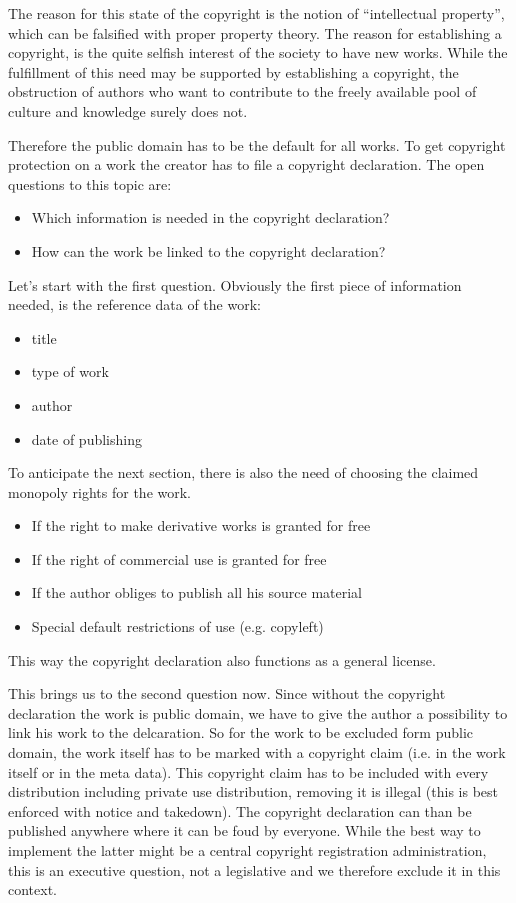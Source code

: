 The reason for this state of the copyright is the notion of ``intellectual property'', which can be falsified with proper property theory. The reason for establishing a copyright, is the quite selfish interest of the society to have new works. While the fulfillment of this need may be supported by establishing a copyright, the obstruction of authors who want to contribute to the freely available pool of culture and knowledge surely does not.

Therefore the public domain has to be the default for all works. To get copyright protection on a work the creator has to file a copyright declaration. The open questions to this topic are:
\begin{itemize}
	\item Which information is needed in the copyright declaration?
	\item How can the work be linked to the copyright declaration?
\end{itemize}

Let's start with the first question. Obviously the first piece of information needed, is the reference data of the work:
\begin{itemize}
	\item title
	\item type of work
	\item author
	\item date of publishing
\end{itemize}
To anticipate the next section, there is also the need of choosing the claimed monopoly rights for the work. 
\begin{itemize}
	\item If the right to make derivative works is granted for free
	\item If the right of commercial use is granted for free
	\item If the author obliges to publish all his source material
	\item Special default restrictions of use (e.g. copyleft)
\end{itemize}
This way the copyright declaration also functions as a general license.

This brings us to the second question now. Since without the copyright declaration the work is public domain, we have to give the author a possibility to link his work to the delcaration. So for the work to be excluded form public domain, the work itself has to be marked with a copyright claim (i.e. in the work itself or in the meta data). This copyright claim has to be included with every distribution including private use distribution, removing it is illegal (this is best enforced with notice and takedown). The copyright declaration can than be published anywhere where it can be foud by everyone. While the best way to implement the latter might be a central copyright registration administration, this is an executive question, not a legislative and we therefore exclude it in this context. 


